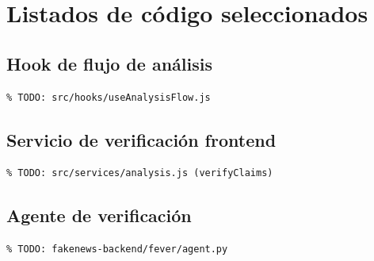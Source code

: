 \documentclass[12pt,a4paper,oneside]{report}
\begin{document}

\chapter{Listados de código seleccionados}

\section{Hook de flujo de análisis}
\begin{verbatim}
% TODO: src/hooks/useAnalysisFlow.js
\end{verbatim}

\section{Servicio de verificación frontend}
\begin{verbatim}
% TODO: src/services/analysis.js (verifyClaims)
\end{verbatim}

\section{Agente de verificación}
\begin{verbatim}
% TODO: fakenews-backend/fever/agent.py
\end{verbatim}
\end{document}
